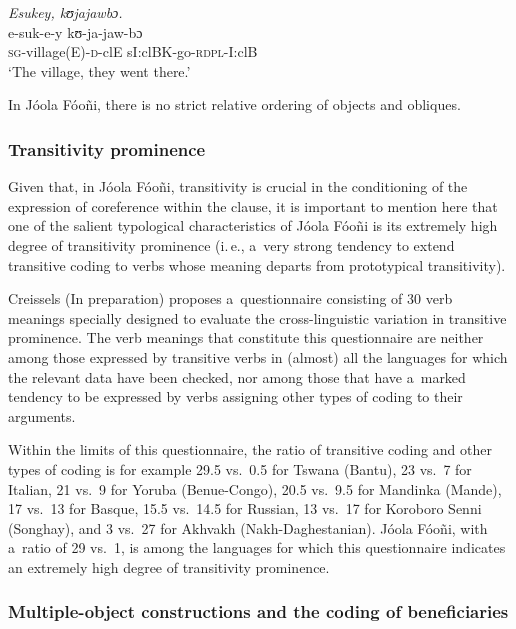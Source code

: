 \documentclass[output=paper]{langscibook}
\begin{document}
    \ex\label{ex:Creissels:3b}
    
      \textit{Esukey, kʊjajawbɔ.}\\
      \gll e-suk-e-y kʊ-ja-jaw-bɔ\\
      \textsc{sg}-village(E)-\textsc{d}-clE sI:clBK-go-\textsc{rdpl}-I:clB\\
      \glt `The village, they went there.'

  \z
\z

In Jóola Fóoñi, there is no strict relative ordering of objects and obliques.

\subsubsection{Transitivity prominence}%
\label{sec:Creissels:transitivity-prominence}

Given that, in Jóola Fóoñi, transitivity is crucial in the conditioning of the
expression of coreference within the clause, it is important to mention here
that one of the salient typological characteristics of Jóola Fóoñi is its
extremely high degree of transitivity prominence (i.\,e., a~very strong
tendency to extend transitive coding to verbs whose meaning departs from
prototypical transitivity).

Creissels (In preparation) proposes a~questionnaire consisting of 30 verb
meanings specially designed to evaluate the cross-linguistic variation in
transitive prominence.  The verb meanings that constitute this questionnaire
are neither among those expressed by transitive verbs in (almost) all the
languages for which the relevant data have been checked, nor among those that
have a~marked tendency to be expressed by verbs assigning other types of coding
to their arguments.

Within the limits of this questionnaire, the ratio of transitive coding and
other types of coding is for example 29.5 vs.\ 0.5 for Tswana (Bantu), 23 vs.\
7 for Italian, 21 vs.\ 9 for Yoruba (Benue-Congo), 20.5 vs.\ 9.5 for Mandinka
(Mande), 17 vs.\ 13 for Basque, 15.5 vs.\ 14.5 for Russian, 13 vs.\ 17 for
Koroboro Senni (Songhay), and 3 vs.\ 27 for Akhvakh (Nakh-Daghestanian).  Jóola
Fóoñi, with a~ratio of 29 vs.\ 1, is among the languages for which this
questionnaire indicates an extremely high degree of transitivity prominence.

\subsubsection{Multiple-object constructions and the coding of beneficiaries}%
\label{sec:Creissels:beneficiaries-coding}
\end{document}
